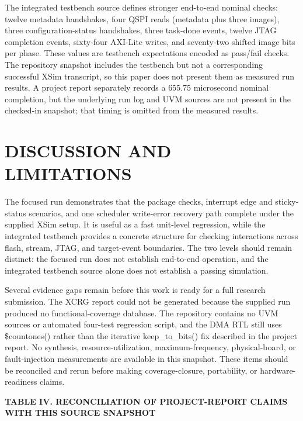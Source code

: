 \documentclass[conference]{IEEEtran}
\begin{document}
The integrated testbench source defines stronger end-to-end nominal checks: twelve metadata handshakes, four QSPI reads (metadata plus three images), three configuration-status handshakes, three task-done events, twelve JTAG completion events, sixty-four AXI-Lite writes, and seventy-two shifted image bits per phase. These values are testbench expectations encoded as pass/fail checks. The repository snapshot includes the testbench but not a corresponding successful XSim transcript, so this paper does not present them as measured run results. A project report separately records a 655.75 microsecond nominal completion, but the underlying run log and UVM sources are not present in the checked-in snapshot; that timing is omitted from the measured results.

\section{DISCUSSION AND LIMITATIONS}

The focused run demonstrates that the package checks, interrupt edge and sticky-status scenarios, and one scheduler write-error recovery path complete under the supplied XSim setup. It is useful as a fast unit-level regression, while the integrated testbench provides a concrete structure for checking interactions across flash, stream, JTAG, and target-event boundaries. The two levels should remain distinct: the focused run does not establish end-to-end operation, and the integrated testbench source alone does not establish a passing simulation.

Several evidence gaps remain before this work is ready for a full research submission. The XCRG report could not be generated because the supplied run produced no functional-coverage database. The repository contains no UVM sources or automated four-test regression script, and the DMA RTL still uses \$countones() rather than the iterative keep\_to\_bits() fix described in the project report. No synthesis, resource-utilization, maximum-frequency, physical-board, or fault-injection measurements are available in this snapshot. These items should be reconciled and rerun before making coverage-closure, portability, or hardware-readiness claims.

\noindent\textbf{\footnotesize TABLE IV. RECONCILIATION OF PROJECT-REPORT CLAIMS WITH THIS SOURCE SNAPSHOT}\par\vspace{1pt}
\end{document}

